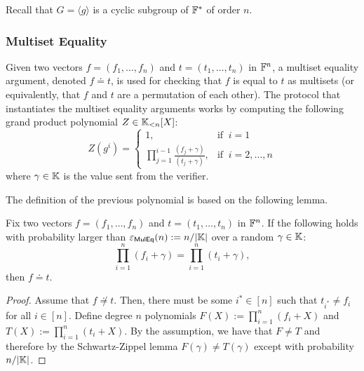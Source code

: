 
Recall that $G = \langle g \rangle$ is a cyclic subgroup of $\mathbb{F}^*$ of order $n$.

\subsubsection*{Multiset Equality}

Given two vectors $f = (f_1, \dots, f_n)$ and $t = (t_1, \dots, t_n)$ in $\mathbb{F}^n$, a multiset equality argument, denoted $f \doteq t$, is used for checking that $f$ is equal to $t$ as multisets (or equivalently, that $f$ and $t$ are a permutation of each other). The protocol that instantiates the multiset equality arguments works by computing the following grand product polynomial $Z \in \mathbb{K}_{<n}[X]$:
\[
  Z(g^i) = 
  \begin{cases} 
  1, & \text{if }~ i=1 \\ 
  \displaystyle\prod_{j=1}^{i-1} \frac{(f_j + \gamma)}{(t_j + \gamma)}, & \text{if }~ i = 2, \dots, n
  \end{cases} 
\]
where $\gamma \in \mathbb{K}$ is the value sent from the verifier. 

The definition of the previous polynomial is based on the following lemma.
\begin{lemma}\label{lemma:muleq-soundness}
  Fix two vectors $f = (f_1, \dots, f_n)$ and $t = (t_1, \dots, t_n)$ in $\mathbb{F}^n$. If the following holds with probability larger than $\varepsilon_{\textsf{MulEq}}(n) := n/|\mathbb{K}|$ over a random $\gamma \in \mathbb{K}$:
  \begin{equation*}
  \prod_{i=1}^n (f_i + \gamma) = \prod_{i=1}^n (t_i + \gamma),
  \end{equation*}
  then $f \doteq t$. 
\end{lemma}
\begin{proof}
  Assume that $f \not\doteq t$. Then, there must be some $i^* \in [n]$ such that $t_{i^*} \neq f_i$ for all $i \in [n]$. Define degree $n$ polynomials $F(X) := \prod_{i=1}^n (f_i + X)$ and $T(X) := \prod_{i=1}^n (t_i + X)$. By the assumption, we have that $F \neq T$ and therefore by the Schwartz-Zippel lemma $F(\gamma) \neq T(\gamma)$ except with probability $n/|\mathbb{K}|$.
\end{proof}

